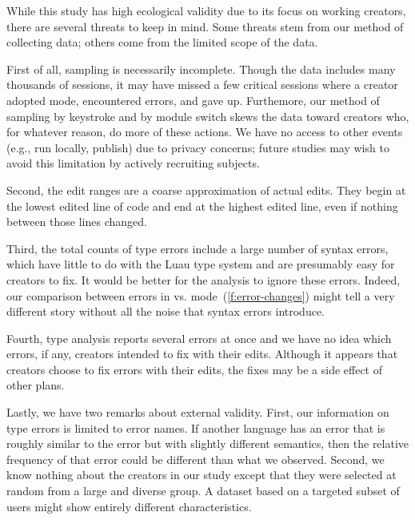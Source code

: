 \documentclass[english,submission,cleveref]{programming}
\begin{document}
While this study has high ecological validity due to its focus on
working creators, there are several threats to keep in mind.
Some threats stem from our method of collecting data; others
come from the limited scope of the data.

First of all, sampling is necessarily incomplete.
Though the data includes many thousands of sessions, it
may have missed a few critical sessions where a creator
adopted \mstrict{} mode, encountered  errors,
and gave up.
Furthemore, our method of sampling by keystroke and by module switch
skews the data toward creators who, for whatever reason, do more
of these actions.
We have no access to other events (e.g., run locally, publish) due to privacy
concerns; future studies may wish to avoid this limitation by actively
recruiting subjects.

Second, the edit ranges are a coarse approximation of actual edits.
They begin at the lowest edited line of code and end at the highest
edited line, even if nothing between those lines changed.

Third, the total counts of type errors include a large number of syntax errors,
which have little to do with the Luau type system and are presumably easy for
creators to fix.
It would be better for the analysis to ignore these errors.
Indeed, our comparison between \FS{} errors in \mnocheck{} vs.
\mstrict{} mode~(\cref{f:error-changes}) might tell a very different story
without all the noise that syntax errors introduce.

Fourth, type analysis reports several errors at once and we have no idea which
errors, if any, creators intended to fix with their edits.
Although it appears that creators choose to fix errors with their edits,
the fixes may be a side effect of other plans.


Lastly, we have two remarks about external validity.
First, our information on type errors is limited to error names.
If another language has an error that is roughly similar to the
 error but with slightly different
semantics, then the relative frequency of that error could be different
than what we observed.
Second, we know nothing about the creators in our study except that they
were selected at random from a large and diverse group.
A dataset based on a targeted subset of users might show entirely different
characteristics.
\end{document}
